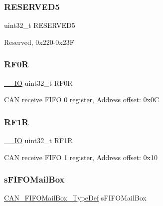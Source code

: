 \subsubsection{\texorpdfstring{R\+E\+S\+E\+R\+V\+E\+D5}{RESERVED5}}
{\footnotesize\ttfamily uint32\+\_\+t R\+E\+S\+E\+R\+V\+E\+D5}

Reserved, 0x220-\/0x23F \mbox{\label{struct_c_a_n___type_def_accf4141cee239380d0ad4634ee21dbf6}} 
\subsubsection{\texorpdfstring{R\+F0R}{RF0R}}
{\footnotesize\ttfamily \hyperlink{core__sc300_8h_aec43007d9998a0a0e01faede4133d6be}{\+\_\+\+\_\+\+IO} uint32\+\_\+t R\+F0R}

C\+AN receive F\+I\+FO 0 register, Address offset\+: 0x0C \mbox{\label{struct_c_a_n___type_def_a02b589bb589df4f39e549dca4d5abb08}} 
\subsubsection{\texorpdfstring{R\+F1R}{RF1R}}
{\footnotesize\ttfamily \hyperlink{core__sc300_8h_aec43007d9998a0a0e01faede4133d6be}{\+\_\+\+\_\+\+IO} uint32\+\_\+t R\+F1R}

C\+AN receive F\+I\+FO 1 register, Address offset\+: 0x10 \mbox{\label{struct_c_a_n___type_def_afdef128e1ffe70acd7033674f7980967}} 
\subsubsection{\texorpdfstring{s\+F\+I\+F\+O\+Mail\+Box}{sFIFOMailBox}}
{\footnotesize\ttfamily \hyperlink{struct_c_a_n___f_i_f_o_mail_box___type_def}{C\+A\+N\+\_\+\+F\+I\+F\+O\+Mail\+Box\+\_\+\+Type\+Def} s\+F\+I\+F\+O\+Mail\+Box}


